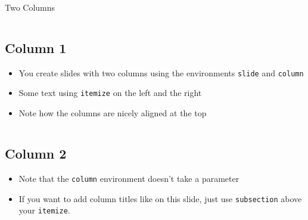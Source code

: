 \documentclass{ltusimple}
\begin{document}
\begin{slide}{Two Columns}
	\begin{column}
		\subsection{Column 1}
		\begin{itemize}
			\item You create slides with two columns using the environments \texttt{slide} and \texttt{column}
			\item Some text using \texttt{itemize} on the left and the right
			\item Note how the columns are nicely aligned at the top
		\end{itemize}
	\end{column}
	\begin{column}
		\subsection{Column 2}
		\begin{itemize}
			\item Note that the \texttt{column} environment doesn't take a parameter
			\item If you want to add column titles like on this slide, just use \texttt{subsection} above your \texttt{itemize}.
		\end{itemize}	
	\end{column}
\end{slide}
\end{document}
